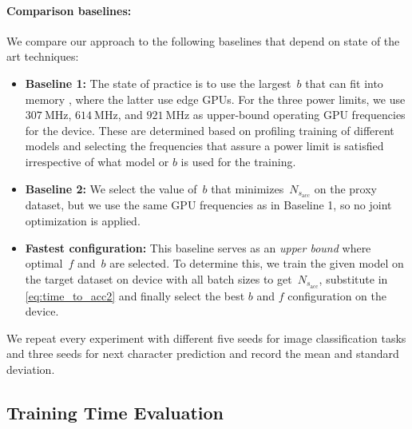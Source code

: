 \paragraph{Comparison baselines:} We compare our approach to the following baselines that depend on state of the art techniques:
\begin{itemize}


    \item \textbf{Baseline 1:} The state of practice is to use the largest~$b$  that can fit into memory \cite{goyal2017accurate, ecsa-10-16202}, where the latter use edge GPUs. For the three power limits, we use $\SI{307}{\mega\hertz}$,  $\SI{614}{\mega\hertz}$, and $\SI{921}{\mega\hertz}$ as upper-bound operating GPU frequencies for the device. These are determined based on profiling training of different models and selecting the frequencies that assure a power limit is satisfied irrespective of what model or $b$ is used for the training.
    
    
    \item \textbf{Baseline 2:} We select the value of~$b$ that minimizes~$N_{{s}_{\text{acc}}}$ on the proxy dataset, but we use the same GPU frequencies as in Baseline 1, so no joint optimization is applied. 
    \item \textbf{Fastest configuration:} This baseline serves as an \textit{upper bound} where optimal~$f$ and~$b$ are selected. To determine this, we train the given model on the target dataset on device with all batch sizes
to get~$N_{s_{\text{acc}}}$, substitute in \cref{eq:time_to_acc2} and finally select the best $b$ and $f$ configuration on the device. 
\end{itemize}
We repeat every experiment with different five seeds for image classification tasks and three seeds for next character prediction and record the mean and standard deviation.

%


\subsection{Training Time Evaluation}
\label{subsec:training_time_evaluation}


